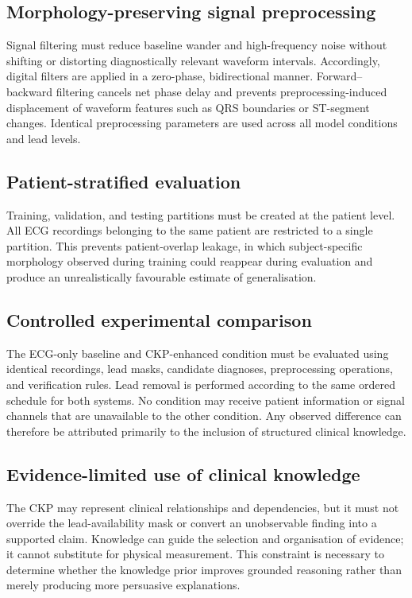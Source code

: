 \documentclass{ssnreview}
\begin{document}
\subsection{Morphology-preserving signal preprocessing}

Signal filtering must reduce baseline wander and high-frequency noise without shifting or
distorting diagnostically relevant waveform intervals. Accordingly, digital filters are
applied in a zero-phase, bidirectional manner. Forward--backward filtering cancels net
phase delay and prevents preprocessing-induced displacement of waveform features such as
QRS boundaries or ST-segment changes. Identical preprocessing parameters are used across
all model conditions and lead levels.

\subsection{Patient-stratified evaluation}

Training, validation, and testing partitions must be created at the patient level. All ECG
recordings belonging to the same patient are restricted to a single partition. This prevents
patient-overlap leakage, in which subject-specific morphology observed during training
could reappear during evaluation and produce an unrealistically favourable estimate of
generalisation.

\subsection{Controlled experimental comparison}

The ECG-only baseline and CKP-enhanced condition must be evaluated using identical
recordings, lead masks, candidate diagnoses, preprocessing operations, and verification
rules. Lead removal is performed according to the same ordered schedule for both systems.
No condition may receive patient information or signal channels that are unavailable to the
other condition. Any observed difference can therefore be attributed primarily to the
inclusion of structured clinical knowledge.

\subsection{Evidence-limited use of clinical knowledge}

The CKP may represent clinical relationships and dependencies, but it must not override the
lead-availability mask or convert an unobservable finding into a supported claim. Knowledge
can guide the selection and organisation of evidence; it cannot substitute for physical
measurement. This constraint is necessary to determine whether the knowledge prior
improves grounded reasoning rather than merely producing more persuasive explanations.
\end{document}

